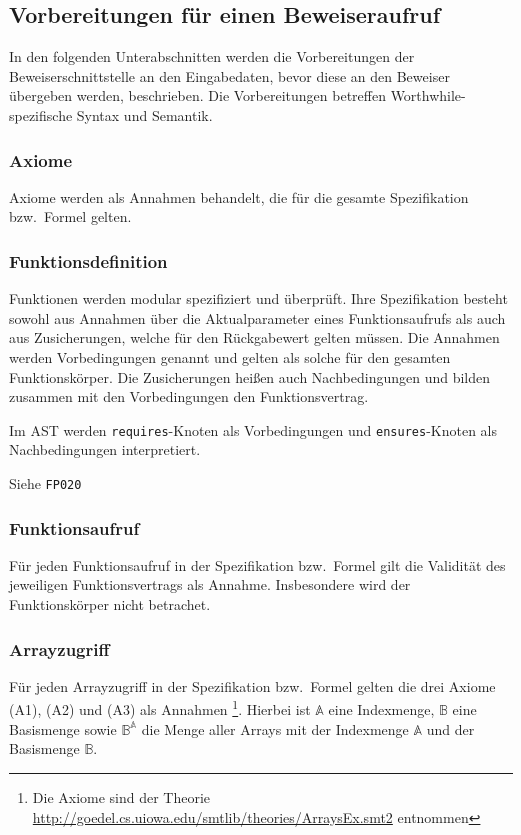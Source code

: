 \subsection{Vorbereitungen für einen Beweiseraufruf}%

In den folgenden Unterabschnitten werden die Vorbereitungen der
Beweiserschnittstelle an den Eingabedaten, bevor diese an den
Beweiser übergeben werden, beschrieben. Die Vorbereitungen
betreffen Worthwhile-spezifische Syntax und Semantik.%

\subsubsection{Axiome}%

Axiome werden als Annahmen behandelt, die für die gesamte
Spezifikation bzw.\ Formel gelten.%

\subsubsection{Funktionsdefinition}%

Funktionen werden modular spezifiziert und überprüft. Ihre
Spezifikation besteht sowohl aus Annahmen über die Aktualparameter
eines Funktionsaufrufs als auch aus Zusicherungen, welche für den
Rückgabewert gelten müssen. Die Annahmen werden Vorbedingungen
genannt und gelten als solche für den gesamten Funktionskörper. Die
Zusicherungen heißen auch Nachbedingungen und bilden zusammen mit den
Vorbedingungen den Funktionsvertrag.%

Im AST werden \texttt{requires}-Knoten als Vorbedingungen und
\texttt{ensures}-Knoten als Nachbedingungen interpretiert.%

Siehe \texttt{FP020}%

\subsubsection{Funktionsaufruf}%

Für jeden Funktionsaufruf in der Spezifikation bzw.\ Formel gilt die
Validität des jeweiligen Funktionsvertrags als Annahme. Insbesondere
wird der Funktionskörper nicht betrachet.%

\subsubsection{Arrayzugriff}%

Für jeden Arrayzugriff in der Spezifikation bzw.\ Formel gelten die
drei Axiome (A1), (A2) und (A3) als Annahmen \footnote{Die Axiome sind
der Theorie
\url{http://goedel.cs.uiowa.edu/smtlib/theories/ArraysEx.smt2}
entnommen}. Hierbei ist $\mathbb{A}$ eine Indexmenge, $\mathbb{B}$
eine Basismenge sowie $\mathbb{B}^\mathbb{A}$ die Menge aller Arrays
mit der Indexmenge $\mathbb{A}$ und der Basismenge $\mathbb{B}$. %

